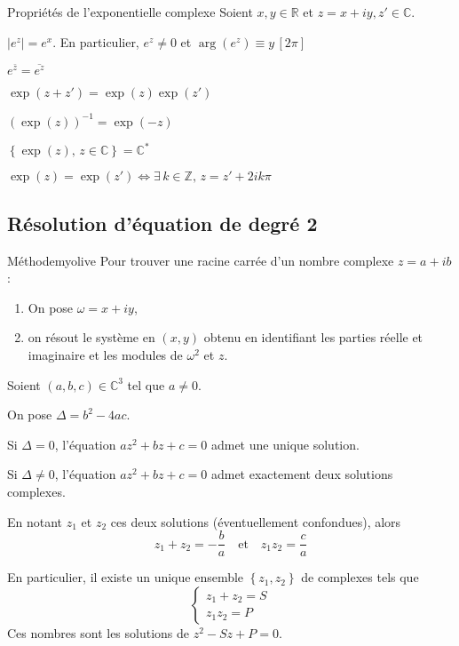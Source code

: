     \begin{prop}{Propriétés de l’exponentielle complexe}{}
        Soient $x,y \in \mathbb{R}$ et $z = x + iy, z' \in \mathbb{C}$.
    
        \begin{alors}
            \item $|e^z| = e^x$. En particulier, $e^z \neq 0$ et $\arg(e^z) \equiv y \, [2 \pi]$
            \item $e^{\bar{z}} = \overline{e^z}$
            \item $\exp(z + z') = \exp(z) \exp(z')$
            \item $(\exp(z))^{-1} = \exp(-z)$
            \item $\left\{ \exp(z), \, z \in \mathbb{C} \right\} = \mathbb{C}^*$
            \item $\exp(z) = \exp(z') \iff \exists \, k \in \mathbb{Z}, \, z = z' + 2ik\pi$
        \end{alors}
    \end{prop}
    
\subsection{Résolution d’équation de degré 2}

    \begin{omed}{Méthode}{myolive}
	    Pour trouver une racine carrée d’un nombre complexe $z = a +ib$ :
	    \begin{enumerate}
		    \item On pose $\omega = x +iy$,
		    \item on résout le système en $(x,y)$ obtenu en identifiant les parties réelle et imaginaire et les modules de $\omega^2$ et $z$.
	    \end{enumerate}
    \end{omed}

    \begin{prop}{}{}
        Soient $(a,b,c) \in \mathbb{C}^3$ tel que $a \neq 0$.
        
        On pose $\Delta = b^2 - 4ac$.
    
        \begin{alors}
            \item Si $\Delta = 0$, l’équation $az^2 + bz +c = 0$ admet une unique solution.
            \item Si $\Delta \neq 0$, l’équation $az^2 + bz + c = 0$ admet exactement deux solutions complexes.
        \end{alors}

        En notant $z_1$ et $z_2$ ces deux solutions (éventuellement confondues), 
        alors 
        \[ z_1 + z_2 = -\frac{b}{a} \quad \text{et} \quad z_1 z_2 = \frac{c}{a} \]

        En particulier, il existe un unique ensemble $\left\{z_1,z_2\right\}$ de complexes tels que \[ \left\{ \begin{array}{l}
			z_1 + z_2 = S \\
			z_1z_2 = P
		\end{array} \right. \]
		Ces nombres sont les solutions de $z^2 -Sz + P = 0$.
    \end{prop}

